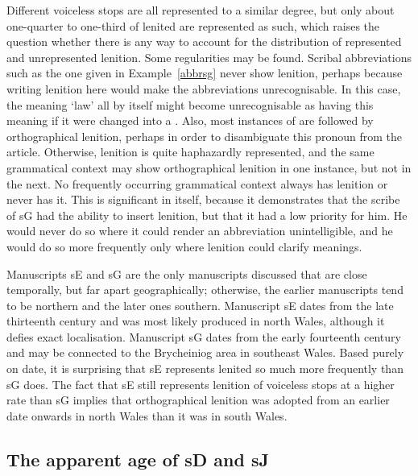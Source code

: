 Different voiceless stops are all represented to a similar degree, but only about one-quarter to one-third of lenited  are represented as such, which raises the question whether there is any way to account for the distribution of represented and unrepresented lenition. Some regularities may be found. Scribal abbreviations such as the one given in Example~\ref{abbrsg} never show lenition, perhaps because writing lenition here would make the abbreviations unrecognisable.
In this case, the  meaning `law' all by itself might become unrecognisable as having this meaning if it were changed into a . Also, most instances of  are followed by orthographical lenition, perhaps in order to disambiguate this pronoun from the article.
Otherwise, lenition is quite haphazardly represented, and the same grammatical context may show orthographical lenition in one instance, but not in the next. No frequently occurring grammatical context always has lenition or never has it. This is significant in itself, because it demonstrates that the scribe of \gls{sG} had the ability to insert lenition, but that it had a low priority for him. He would never do so where it could render an abbreviation unintelligible, and he would do so more frequently only where lenition could clarify meanings.

Manuscripts \gls{sE} and \gls{sG} are the only manuscripts discussed that are close temporally, but far apart geographically; otherwise, the earlier manuscripts tend to be northern and the later ones southern.
Manuscript \gls{sE} dates from the late thirteenth century and was most likely produced in north Wales, although it defies exact localisation. Manuscript \gls{sG} dates from the early fourteenth century and may be connected to the Brycheiniog area in southeast Wales. Based purely on date, it is surprising that \gls{sE} represents lenited  so much more frequently than \gls{sG} does. The fact that \gls{sE} still represents lenition of voiceless stops at a higher rate than \gls{sG} implies that orthographical lenition was adopted from an earlier date onwards in north Wales than it was in south Wales.

\subsection{The apparent age of \gls{sD} and \gls{sJ}}
\label{sec:apparent-age-glssd}

